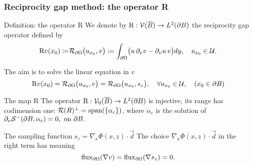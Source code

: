 \documentclass[10pt,xcolor={dvipsnames}]{beamer}
\theoremstyle{plain}
\theoremstyle{plain}
\begin{document}
\begin{frame}
 \frametitle{Reciprocity gap method: the operator R}
\begin{block}{Definition: the operator R}
 \footnotesize
{
 We denote by $\textup{R} : \mathcal{V}(\overline{B})\to L^2(\partial B)$ the {\color{blue}reciprocity gap operator}
 defined by}
\begin{equation}
 {
 \textup{R}v(x_0)\coloneqq }
 \mathcal{R}_{\partial\Omega}\bigl(u_{x_0},v\bigr)
 \coloneqq \int_{\partial \Omega}\bigl(u\,\partial_\nu v - \partial_\nu u \,v \bigr)dy,\quad u_{x_0}\in\mathcal{U}.
\end{equation}
\end{block}
{\footnotesize
  The aim is to solve the linear equation in $v$}
\begin{equation}
 \textup{R}v(x_0) = 
 \mathcal{R}_{\partial\Omega}\bigl(u_{x_0},v\bigr) = 
 \mathcal{R}_{\partial\Omega}\bigl(u_{x_0},s_z\bigr),\quad \forall u_{x_0}\in\mathcal{U}, 
 \quad (x_0\in\partial B)
\end{equation}

 \begin{block}{The {\color{blue}map} R}
  \footnotesize
 The operator $\textup{R} : \mathcal{V}_0(\overline{B})\to L^2(\partial B)$ is injective,
its range has codimension one: $\mathcal{R}(R)^\perp=\textup{span}(\{\alpha_c\})$,
 where $\alpha_c$ is the solution of 
 $
  \partial_\nu \mathcal{S}^-(\partial B,\alpha_c) = 0,\textup{ on }\partial B.
 $
 \end{block}
 \begin{block}{The {\color{blue}sampling function} $s_z = \nabla_x\Phi(x,z)\cdot \vec{d}$}
 \footnotesize
 The choice $\nabla_x\Phi(x,z)\cdot \vec{d}$ in the right term has meaning
 \begin{equation*}
  \textup{flux}_{\partial\Omega}(\nabla v) = \textup{flux}_{\partial\Omega}(
  \nabla s_z)=0 .
 \end{equation*}
 \end{block}



\end{frame}
\end{document}
